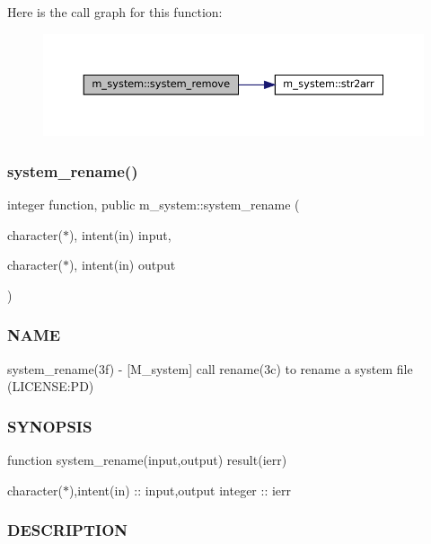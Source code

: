 Here is the call graph for this function\+:
\nopagebreak
\begin{figure}[H]
\begin{center}
\leavevmode
\includegraphics[width=350pt]{namespacem__system_a730ae64294e3cd73bde8f0c63cdf9972_cgraph}
\end{center}
\end{figure}
\mbox{\label{namespacem__system_adfbaf3d17790da9ba0c520683d5b8003}} 
\subsubsection{\texorpdfstring{system\+\_\+rename()}{system\_rename()}}
{\footnotesize\ttfamily integer function, public m\+\_\+system\+::system\+\_\+rename (\begin{DoxyParamCaption}\item[{character($\ast$), intent(in)}]{input,  }\item[{character($\ast$), intent(in)}]{output }\end{DoxyParamCaption})}



\subsubsection*{N\+A\+ME}

system\+\_\+rename(3f) -\/ \mbox{[}M\+\_\+system\mbox{]} call rename(3c) to rename a system file (L\+I\+C\+E\+N\+SE\+:PD) \subsubsection*{S\+Y\+N\+O\+P\+S\+IS}

function system\+\_\+rename(input,output) result(ierr)

character($\ast$),intent(in) \+:\+: input,output integer \+:\+: ierr \subsubsection*{D\+E\+S\+C\+R\+I\+P\+T\+I\+ON}

